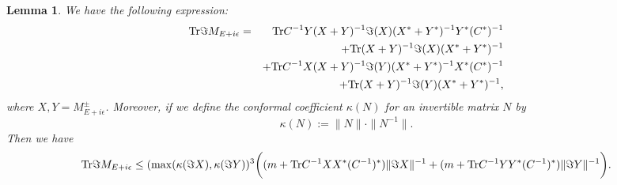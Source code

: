 \documentclass[11pt]{amsart}
\newtheorem{lemma}[theorem]{Lemma}
\theoremstyle{remark}
\theoremstyle{definition}
\newcommand{\tr}{{\rm Tr}}
\begin{document}
\begin{lemma}\label{est imM} We have the following expression:
\begin{eqnarray}\label{im m}
  \tr\Im M_{E+i\epsilon}&=&\tr C^{-1}Y(X+Y)^{-1} \Im (X)(X^\ast+Y^\ast)^{-1}Y^\ast(C^*)^{-1}\\\nonumber
  &&+\tr(X+Y)^{-1}\Im (X)(X^\ast+Y^\ast)^{-1}\\\nonumber
  &&+\tr C^{-1}X(X+Y)^{-1}\Im (Y)(X^\ast+Y^\ast)^{-1}X^\ast(C^*)^{-1}\\\nonumber
  &&+\tr(X+Y)^{-1}\Im (Y)(X^\ast+Y^\ast)^{-1},
 \end{eqnarray}where $X,Y=M^{\pm}_{E+i\epsilon}$.
Moreover, if we define the conformal coefficient $\kappa(N)$ for an invertible matrix $N$ by 
\begin{equation*}
\kappa(N):=\|N\|\cdot \|N^{-1}\|.
\end{equation*}
Then we have 
\begin{equation}\label{im M contr} \tr\Im M_{E+i\epsilon}
\leq (\max(\kappa(\Im X),\kappa(\Im Y))^3 \bigg((m+\tr C^{-1} XX^\ast(C^{-1})^*) \|\Im  X\|^{-1}+(m+\tr C^{-1} YY^\ast(C^{-1})^*) \|\Im  Y\|^{-1}\bigg).
\end{equation}
\end{lemma}
\end{document}

